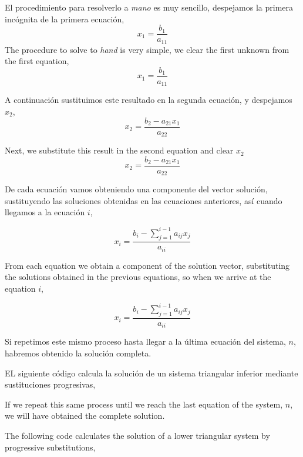 \begin{paracol}{2}
El procedimiento para resolverlo a \emph{mano} es muy sencillo,
despejamos la primera incógnita de la primera ecuación,
\begin{equation*}
x_1=\frac{b_1}{a_{11}}
\end{equation*}
\switchcolumn  
The procedure to solve to \emph{hand} is very simple,
we clear the first unknown from the first equation,
\begin{equation*}
x_1=\frac{b_1}{a_{11}}
\end{equation*}

\switchcolumn
A continuación sustituimos este resultado en la segunda ecuación, y despejamos $x_2$,
\begin{equation*}
x_2=\frac{b_2-a_{21}x_1}{a_{22}}
\end{equation*}

\switchcolumn
Next, we substitute this result in the second equation and clear $x_2$
\begin{equation*}
x_2=\frac{b_2-a_{21}x_1}{a_{22}}
\end{equation*}

\switchcolumn

De cada ecuación vamos obteniendo una componente del vector solución, sustituyendo las soluciones obtenidas en las ecuaciones anteriores, así cuando llegamos a la ecuación $i$,

\begin{equation*}
x_i=\frac{b_i-\sum_{j=1}^{i-1}a_{ij}x_j}{a_{ii}}
\end{equation*}

\switchcolumn
From each equation we obtain a component of the solution vector, substituting the solutions obtained in the previous equations, so when we arrive at the equation $i$,

\begin{equation*}
x_i=\frac{b_i-\sum_{j=1}^{i-1}a_{ij}x_j}{a_{ii}}
\end{equation*}

\switchcolumn
Si repetimos este mismo proceso hasta llegar a la última ecuación del sistema, $n$, habremos obtenido la solución completa.

EL siguiente código calcula la solución de un sistema triangular inferior mediante sustituciones progresivas,

\switchcolumn

If we repeat this same process until we reach the last equation of the system, $n$, we will have obtained the complete solution.

The following code calculates the solution of a lower triangular system by progressive substitutions,
\end{paracol}

